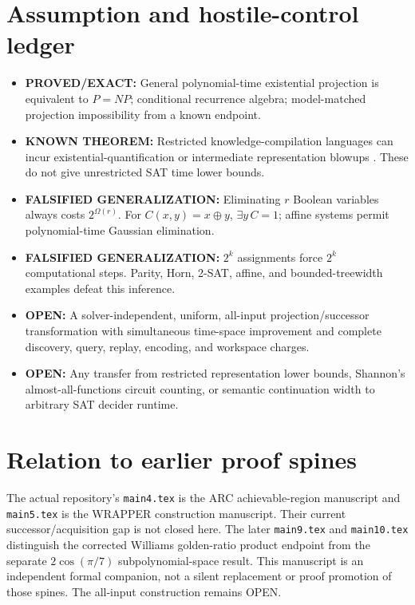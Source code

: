 \documentclass[11pt]{article}
\begin{document}
\section{Assumption and hostile-control ledger}
\begin{itemize}
\item[] \textbf{PROVED/EXACT:} General polynomial-time existential
projection is equivalent to $P=NP$; conditional recurrence algebra;
model-matched projection impossibility from a known endpoint.
\item[] \textbf{KNOWN THEOREM:} Restricted knowledge-compilation
languages can incur existential-quantification or intermediate
representation blowups \cite{capelli,vinall,decolnet}. These do not
give unrestricted SAT time lower bounds.
\item[] \textbf{FALSIFIED GENERALIZATION:} Eliminating $r$ Boolean
variables always costs $2^{\Omega(r)}$. For
$C(x,y)=x\oplus y$, $\exists y\,C=1$; affine systems permit
polynomial-time Gaussian elimination.
\item[] \textbf{FALSIFIED GENERALIZATION:} $2^k$ assignments force
$2^k$ computational steps. Parity, Horn, 2-SAT, affine, and
bounded-treewidth examples defeat this inference.
\item[] \textbf{OPEN:} A solver-independent, uniform, all-input
projection/successor transformation with simultaneous time-space
improvement and complete discovery, query, replay, encoding, and
workspace charges.
\item[] \textbf{OPEN:} Any transfer from restricted representation
lower bounds, Shannon's almost-all-functions circuit counting, or
semantic continuation width to arbitrary SAT decider runtime.
\end{itemize}

\section{Relation to earlier proof spines}
The actual repository's \texttt{main4.tex} is the ARC achievable-region
manuscript and \texttt{main5.tex} is the WRAPPER construction manuscript.
Their current successor/acquisition gap is not closed here.
The later \texttt{main9.tex} and \texttt{main10.tex} distinguish the
corrected Williams golden-ratio product endpoint from the separate
$2\cos(\pi/7)$ subpolynomial-space result. This manuscript is an
independent formal companion, not a silent replacement or proof
promotion of those spines. The all-input construction remains OPEN.
\end{document}
